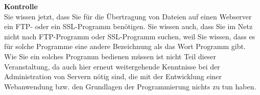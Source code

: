 \textbf{Kontrolle}\\

Sie wissen jetzt, dass Sie für die Übertragung von Dateien auf einen Webserver ein FTP- oder ein SSL-Programm benötigen. Sie wissen auch, dass Sie im Netz nicht nach FTP-Programm oder SSL-Programm suchen, weil Sie wissen, dass es für solche Programme eine andere Bezeichnung als das Wort Programm gibt.\\

Wie Sie ein solches Programm bedienen müssen ist nicht Teil dieser Veranstaltung, da auch hier erneut weitergehende Kenntnisse bei der Administration von Servern nötig sind, die mit der Entwicklung einer Webanwendung bzw. den Grundlagen der Programmierung nichts zu tun haben.

